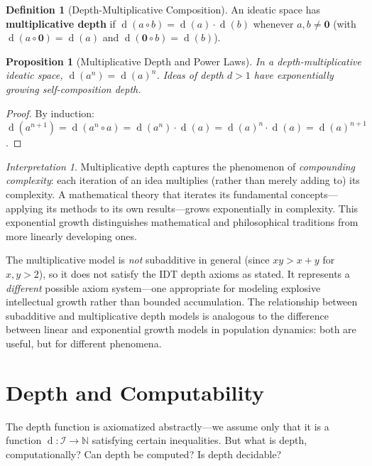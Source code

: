 \documentclass[11pt,openany]{book}
\theoremstyle{definition}
\newtheorem{definition}[axiom]{Definition}
\theoremstyle{plain}
\newtheorem{proposition}[axiom]{Proposition}
\theoremstyle{remark}
\newtheorem{interpretation}[axiom]{Interpretation}
\newcommand{\IS}{\mathcal{I}}               %
\newcommand{\compose}{\circ}                 %
\newcommand{\void}{\mathbf{0}}              %
\newcommand{\depth}{\operatorname{d}}       %
\begin{document}
\begin{definition}[Depth-Multiplicative Composition]
An ideatic space has \textbf{multiplicative depth} if $\depth(a \compose b) = \depth(a) \cdot \depth(b)$ whenever $a, b \neq \void$ (with $\depth(a \compose \void) = \depth(a)$ and $\depth(\void \compose b) = \depth(b)$).
\end{definition}

\begin{proposition}[Multiplicative Depth and Power Laws]
In a depth-multiplicative ideatic space, $\depth(a^n) = \depth(a)^n$. Ideas of depth $d > 1$ have exponentially growing self-composition depth.
\end{proposition}

\begin{proof}
By induction: $\depth(a^{n+1}) = \depth(a^n \compose a) = \depth(a^n) \cdot \depth(a) = \depth(a)^n \cdot \depth(a) = \depth(a)^{n+1}$.
\end{proof}

\begin{interpretation}
Multiplicative depth captures the phenomenon of \emph{compounding complexity}: each iteration of an idea multiplies (rather than merely adding to) its complexity. A mathematical theory that iterates its fundamental concepts---applying its methods to its own results---grows exponentially in complexity. This exponential growth distinguishes mathematical and philosophical traditions from more linearly developing ones.

The multiplicative model is \emph{not} subadditive in general (since $xy > x + y$ for $x, y > 2$), so it does not satisfy the IDT depth axioms as stated. It represents a \emph{different} possible axiom system---one appropriate for modeling explosive intellectual growth rather than bounded accumulation. The relationship between subadditive and multiplicative depth models is analogous to the difference between linear and exponential growth models in population dynamics: both are useful, but for different phenomena.
\end{interpretation}

\section{Depth and Computability}

The depth function is axiomatized abstractly---we assume only that it is a function $\depth : \IS \to \mathbb{N}$ satisfying certain inequalities. But what is depth, computationally? Can depth be computed? Is depth decidable?
\end{document}
